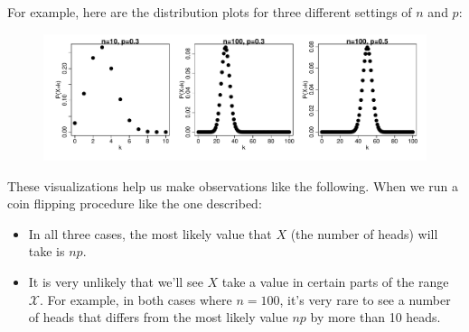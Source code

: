 \documentclass[11pt]{article}
\begin{document}
For example, here are the distribution plots for three different settings of $n$ and $p$:

\begin{figure}[h!]
\centering
\includegraphics[width=\textwidth]{images/bins.pdf}
\end{figure}

These visualizations help us make observations like the following. When we run a coin flipping procedure like the one described:
\begin{itemize}
\item In all three cases, the most likely value that $X$ (the number of heads) will take is $np$.
\item It is very unlikely that we'll see $X$ take a value in certain parts of the range $\mathcal X$. For example, in both cases where $n = 100$, it's very rare to see a number of heads that differs from the most likely value $np$ by more than 10 heads.
\end{itemize}
\end{document}
